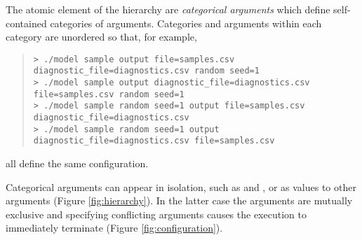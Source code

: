 The atomic element of the hierarchy are \textit{categorical arguments}
which define self-contained categories of arguments.  Categories and
arguments within each category are unordered so that, for example,
%
\begin{quote}
\begin{Verbatim}[fontshape=sl,fontsize=\small]
> ./model sample output file=samples.csv diagnostic_file=diagnostics.csv random seed=1
> ./model sample output diagnostic_file=diagnostics.csv file=samples.csv random seed=1
> ./model sample random seed=1 output file=samples.csv diagnostic_file=diagnostics.csv 
> ./model sample random seed=1 output diagnostic_file=diagnostics.csv file=samples.csv 
\end{Verbatim}
\end{quote}
%
all define the same configuration.

Categorical arguments can appear in isolation, such as  and
, or as values to other arguments (Figure \ref{fig:hierarchy}).  In the latter case the arguments
are mutually exclusive and specifying conflicting arguments causes the execution
to immediately terminate (Figure \ref{fig:configuration}).

